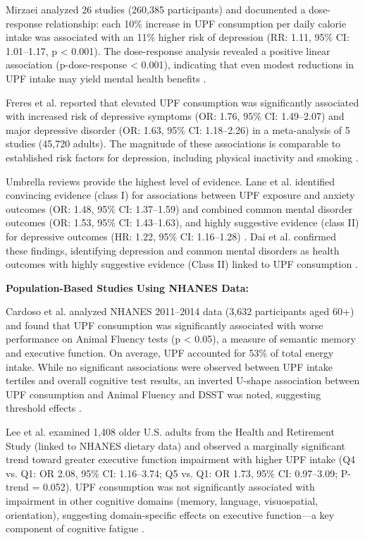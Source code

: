 \documentclass[journal,twoside,10pt]{IEEEtran}
\begin{document}
Mirzaei \cite{ref27} analyzed 26 studies (260,385 participants) and documented a dose-response relationship: each 10\% increase in UPF consumption per daily calorie intake was associated with an 11\% higher risk of depression (RR: 1.11, 95\% CI: 1.01--1.17, p < 0.001). The dose-response analysis revealed a positive linear association (p-dose-response < 0.001), indicating that even modest reductions in UPF intake may yield mental health benefits \cite{ref27}.

Freres et al. \cite{ref35} reported that elevated UPF consumption was significantly associated with increased risk of depressive symptoms (OR: 1.76, 95\% CI: 1.49--2.07) and major depressive disorder (OR: 1.63, 95\% CI: 1.18--2.26) in a meta-analysis of 5 studies (45,720 adults). The magnitude of these associations is comparable to established risk factors for depression, including physical inactivity and smoking \cite{ref35}.

Umbrella reviews provide the highest level of evidence. Lane et al. \cite{ref29} identified convincing evidence (class I) for associations between UPF exposure and anxiety outcomes (OR: 1.48, 95\% CI: 1.37--1.59) and combined common mental disorder outcomes (OR: 1.53, 95\% CI: 1.43--1.63), and highly suggestive evidence (class II) for depressive outcomes (HR: 1.22, 95\% CI: 1.16--1.28) \cite{ref29}. Dai et al. \cite{ref30} confirmed these findings, identifying depression and common mental disorders as health outcomes with highly suggestive evidence (Class II) linked to UPF consumption \cite{ref30}.

\textbf{Population-Based Studies Using NHANES Data:}

Cardoso et al. \cite{ref18} analyzed NHANES 2011--2014 data (3,632 participants aged 60+) and found that UPF consumption was significantly associated with worse performance on Animal Fluency tests (p < 0.05), a measure of semantic memory and executive function. On average, UPF accounted for 53\% of total energy intake. While no significant associations were observed between UPF intake tertiles and overall cognitive test results, an inverted U-shape association between UPF consumption and Animal Fluency and DSST was noted, suggesting threshold effects \cite{ref18}.

Lee et al. \cite{ref22} examined 1,408 older U.S. adults from the Health and Retirement Study (linked to NHANES dietary data) and observed a marginally significant trend toward greater executive function impairment with higher UPF intake (Q4 vs. Q1: OR 2.08, 95\% CI: 1.16--3.74; Q5 vs. Q1: OR 1.73, 95\% CI: 0.97--3.09; P-trend = 0.052). UPF consumption was not significantly associated with impairment in other cognitive domains (memory, language, visuospatial, orientation), suggesting domain-specific effects on executive function---a key component of cognitive fatigue \cite{ref22}.
\end{document}

